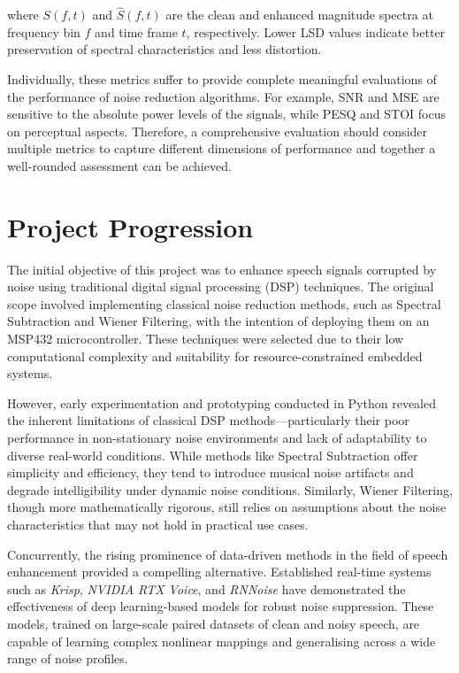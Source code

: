where \( S(f, t) \) and \( \hat{S}(f, t) \) are the clean and enhanced magnitude spectra at frequency bin \( f \) and time frame \( t \), respectively. Lower LSD values indicate better preservation of spectral characteristics and less distortion.

\vspace{1em}
Individually, these metrics suffer to provide complete meaningful evaluations of the performance of noise reduction algorithms. For example, SNR and MSE are sensitive to the absolute power levels of the signals, while PESQ and STOI focus on perceptual aspects. Therefore, a comprehensive evaluation should consider multiple metrics to capture different dimensions of performance and together a well-rounded assessment can be achieved.


\section{Project Progression}
\label{sec:project_progression}

The initial objective of this project was to enhance speech signals corrupted by noise using traditional digital signal processing (DSP) techniques. The original scope involved implementing classical noise reduction methods, such as Spectral Subtraction and Wiener Filtering, with the intention of deploying them on an MSP432 microcontroller. These techniques were selected due to their low computational complexity and suitability for resource-constrained embedded systems.

However, early experimentation and prototyping conducted in Python revealed the inherent limitations of classical DSP methods—particularly their poor performance in non-stationary noise environments and lack of adaptability to diverse real-world conditions. While methods like Spectral Subtraction offer simplicity and efficiency, they tend to introduce musical noise artifacts and degrade intelligibility under dynamic noise conditions. Similarly, Wiener Filtering, though more mathematically rigorous, still relies on assumptions about the noise characteristics that may not hold in practical use cases.

Concurrently, the rising prominence of data-driven methods in the field of speech enhancement provided a compelling alternative. Established real-time systems such as \textit{Krisp}, \textit{NVIDIA RTX Voice}, and \textit{RNNoise} have demonstrated the effectiveness of deep learning-based models for robust noise suppression. These models, trained on large-scale paired datasets of clean and noisy speech, are capable of learning complex nonlinear mappings and generalising across a wide range of noise profiles.

